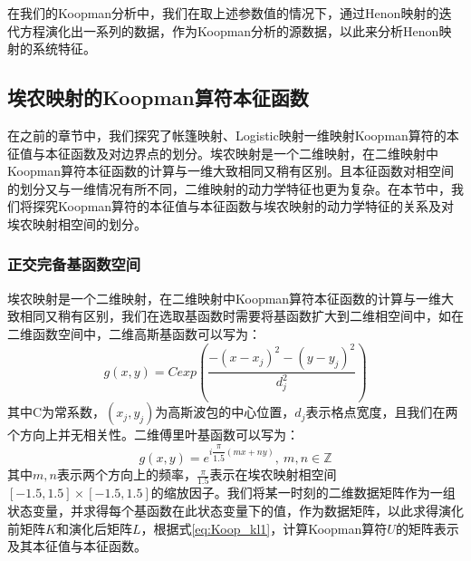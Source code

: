 在我们的Koopman分析中，我们在取上述参数值的情况下，通过Henon映射的迭代方程演化出一系列的数据，作为Koopman分析的源数据，以此来分析Henon映射的系统特征。


\subsection{埃农映射的Koopman算符本征函数}
在之前的章节中，我们探究了帐篷映射、Logistic映射一维映射Koopman算符的本征值与本征函数及对边界点的划分。埃农映射是一个二维映射，在二维映射中Koopman算符本征函数的计算与一维大致相同又稍有区别。且本征函数对相空间的划分又与一维情况有所不同，二维映射的动力学特征也更为复杂。在本节中，我们将探究Koopman算符的本征值与本征函数与埃农映射的动力学特征的关系及对埃农映射相空间的划分。



\subsubsection{正交完备基函数空间}
埃农映射是一个二维映射，在二维映射中Koopman算符本征函数的计算与一维大致相同又稍有区别，我们在选取基函数时需要将基函数扩大到二维相空间中，如在二维函数空间中，二维高斯基函数可以写为：
\begin{equation}
  g(x,y)=Cexp({\dfrac{-(x-x_j)^2-(y-y_j)^2}{d_j^2}})
\end{equation}
其中C为常系数，$(x_j,y_j)$为高斯波包的中心位置，$d_j$表示格点宽度，且我们在两个方向上并无相关性。二维傅里叶基函数可以写为：
\begin{equation}
  g(x,y)=e^{i\dfrac{\pi}{1.5}(mx+ny)},\ m,n\in\mathbb{Z}
\end{equation}
其中$m,n$表示两个方向上的频率，$\frac{\pi}{1.5}$表示在埃农映射相空间$[-1.5,1.5]\times [-1.5,1.5]$的缩放因子。我们将某一时刻的二维数据矩阵作为一组状态变量，并求得每个基函数在此状态变量下的值，作为数据矩阵，以此求得演化前矩阵$K$和演化后矩阵$L$，根据式\eqref{eq:Koop_kl1}，计算Koopman算符$U$的矩阵表示及其本征值与本征函数。

